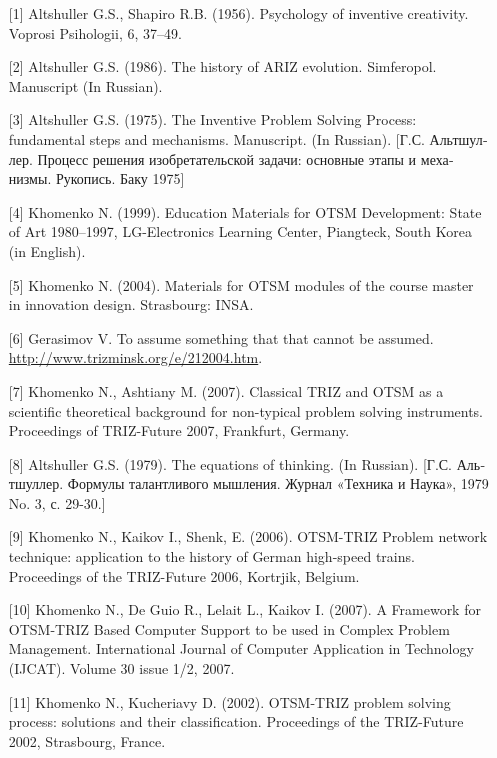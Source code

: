 \documentclass[11pt,a4paper]{article}
\begin{document}
\begin{itemize}
\item[{[1]}] Altshuller G.S., Shapiro R.B.  (1956).  Psychology of inventive
  creativity.  Voprosi Psihologii, 6, 37–49.
\item[{[2]}] Altshuller G.S.  (1986).  The history of ARIZ evolution.
  Simferopol. Manuscript (In Russian).
\item[{[3]}] Altshuller G.S. (1975). The Inventive Problem Solving Process:
  fundamental steps and mechanisms.  Manuscript.  (In Russian).
  [\foreignlanguage{russian}{Г.С.  Альтшуллер. Процесс решения изобретательской
      задачи: основные этапы и механизмы. Рукопись. Баку 1975}]
\item[{[4]}] Khomenko N.  (1999). Education Materials for OTSM Development:
  State of Art 1980–1997, LG-Electronics Learning Center, Piangteck, South
  Korea (in English).
\item[{[5]}] Khomenko N.  (2004).  Materials for OTSM modules of the course
  master in innovation design. Strasbourg: INSA.
\item[{[6]}] Gerasimov V.  To assume something that that cannot be assumed.\\ 
  \url{http://www.trizminsk.org/e/212004.htm}. 
\item[{[7]}] Khomenko N., Ashtiany M. (2007).  Classical TRIZ and OTSM as a
  scientific theoretical background for non-typical problem solving
  instruments.  Proceedings of TRIZ-Future 2007, Frankfurt, Germany.
\item[{[8]}] Altshuller G.S.  (1979). The equations of thinking.  (In
  Russian).  [\foreignlanguage{russian}{Г.С.  Альтшуллер.  Формулы
      талантливого мышления. Журнал «Техника и Наука», 1979 No. 3, с. 29-30}.]
\item[{[9]}] Khomenko N., Kaikov I., Shenk, E. (2006).  OTSM-TRIZ Problem
  network technique: application to the history of German high-speed trains.
  Proceedings of the TRIZ-Future 2006, Kortrjik, Belgium.
\item[{[10]}] Khomenko N., De Guio R., Lelait L., Kaikov I. (2007).  A
  Framework for OTSM-TRIZ Based Computer Support to be used in Complex Problem
  Management.  International Journal of Computer Application in Technology
  (IJCAT).  Volume 30 issue 1/2, 2007.
\item[{[11]}] Khomenko N., Kucheriavy D. (2002).  OTSM-TRIZ problem solving
  process: solutions and their classification.  Proceedings of the TRIZ-Future
  2002, Strasbourg, France.
\end{itemize}
\end{document}
